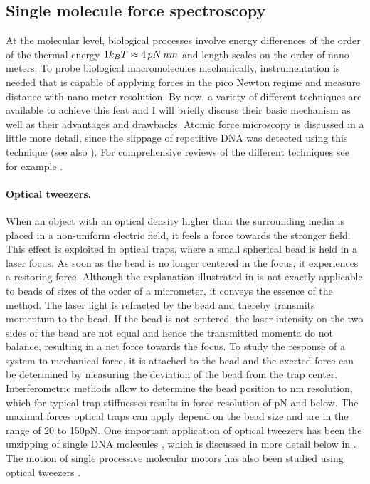 \subsection{\label{sec:force_spectroscopy}Single molecule force spectroscopy}
At the molecular level, biological processes involve energy differences of the order of the thermal energy
$1k_BT\approx 4\,pN\,nm$ and length scales on the order of nano meters.
To probe biological macromolecules mechanically, 
instrumentation is needed that is capable of applying forces in the pico Newton 
regime and measure distance with nano meter resolution. By now, a variety of different
techniques are available to achieve this feat and I will briefly discuss their basic mechanism
as well as their advantages and drawbacks. Atomic force microscopy is discussed in a little
more detail, since the slippage of repetitive DNA was detected using this technique
(see also ). For comprehensive reviews of the 
different techniques see for example \cite{Merkel_PhysRep_01, Bustamante_NMCB_00,Clausen-Schaumann_CurrOpChemBio_00}.

\paragraph{Optical tweezers.} 
When an object with an optical density higher than the surrounding  media is placed
in a non-uniform electric field, it feels a force towards the stronger field. This effect is exploited
in optical traps, where a small spherical bead is held in a laser focus. As soon as the bead is 
no longer centered in the focus, it experiences a restoring force. Although the explanation illustrated
in  is not exactly applicable to beads of sizes of the order of a micrometer, it
conveys the essence of the method. The laser light is refracted by the bead and thereby transmits
momentum to the bead. If the bead is not centered, the laser intensity on the two sides of the bead
are not equal and hence the transmitted momenta do not balance, resulting in a net force towards
the focus. To study the response of a system to mechanical force, it is attached to the
bead and the exerted force can be determined by measuring the deviation of the bead from the 
trap center.  Interferometric methods allow to determine the bead position to nm resolution,
which for typical trap stiffnesses results in force resolution of pN and below.
The maximal forces optical traps can apply depend on the bead size and are in the range of 20 to 150pN.
One important application of optical tweezers has been the unzipping of single DNA molecules
\cite{Bockelmann_BiophysJ_02}, which is discussed in more detail below in . 
The motion of single processive molecular motors has also been studied using optical tweezers \cite{Clemen_BioPhysJ_05}.

